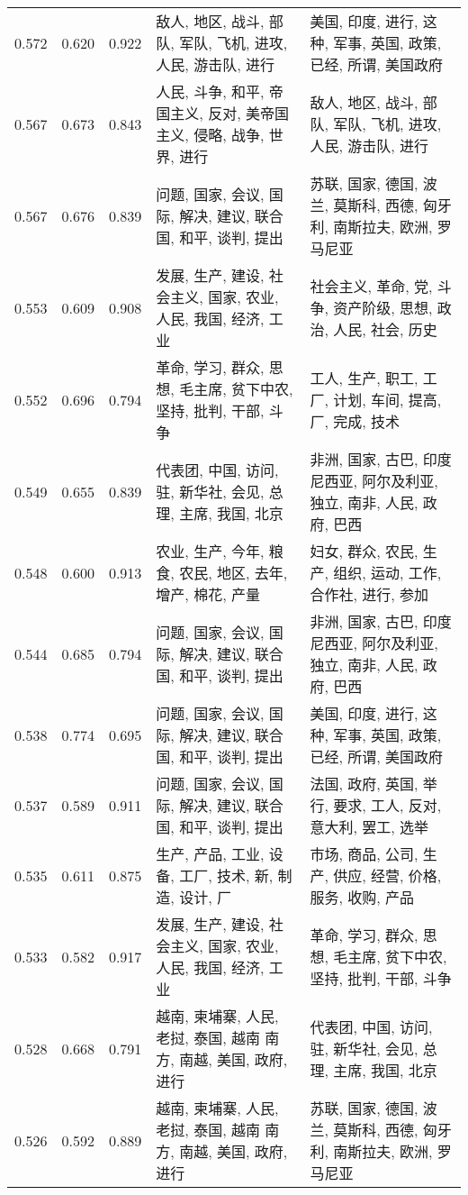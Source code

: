 \begin{tabular}{cccp{5cm}p{5cm}}
0.572 & 0.620 & 0.922 & 敌人, 地区, 战斗, 部队, 军队, 飞机, 进攻, 人民, 游击队, 进行 & 美国, 印度, 进行, 这种, 军事, 英国, 政策, 已经, 所谓, 美国政府 \\
0.567 & 0.673 & 0.843 & 人民, 斗争, 和平, 帝国主义, 反对, 美帝国主义, 侵略, 战争, 世界, 进行 & 敌人, 地区, 战斗, 部队, 军队, 飞机, 进攻, 人民, 游击队, 进行 \\
0.567 & 0.676 & 0.839 & 问题, 国家, 会议, 国际, 解决, 建议, 联合国, 和平, 谈判, 提出 & 苏联, 国家, 德国, 波兰, 莫斯科, 西德, 匈牙利, 南斯拉夫, 欧洲, 罗马尼亚 \\
0.553 & 0.609 & 0.908 & 发展, 生产, 建设, 社会主义, 国家, 农业, 人民, 我国, 经济, 工业 & 社会主义, 革命, 党, 斗争, 资产阶级, 思想, 政治, 人民, 社会, 历史 \\
0.552 & 0.696 & 0.794 & 革命, 学习, 群众, 思想, 毛主席, 贫下中农, 坚持, 批判, 干部, 斗争 & 工人, 生产, 职工, 工厂, 计划, 车间, 提高, 厂, 完成, 技术 \\
0.549 & 0.655 & 0.839 & 代表团, 中国, 访问, 驻, 新华社, 会见, 总理, 主席, 我国, 北京 & 非洲, 国家, 古巴, 印度尼西亚, 阿尔及利亚, 独立, 南非, 人民, 政府, 巴西 \\
0.548 & 0.600 & 0.913 & 农业, 生产, 今年, 粮食, 农民, 地区, 去年, 增产, 棉花, 产量 & 妇女, 群众, 农民, 生产, 组织, 运动, 工作, 合作社, 进行, 参加 \\
0.544 & 0.685 & 0.794 & 问题, 国家, 会议, 国际, 解决, 建议, 联合国, 和平, 谈判, 提出 & 非洲, 国家, 古巴, 印度尼西亚, 阿尔及利亚, 独立, 南非, 人民, 政府, 巴西 \\
0.538 & 0.774 & 0.695 & 问题, 国家, 会议, 国际, 解决, 建议, 联合国, 和平, 谈判, 提出 & 美国, 印度, 进行, 这种, 军事, 英国, 政策, 已经, 所谓, 美国政府 \\
0.537 & 0.589 & 0.911 & 问题, 国家, 会议, 国际, 解决, 建议, 联合国, 和平, 谈判, 提出 & 法国, 政府, 英国, 举行, 要求, 工人, 反对, 意大利, 罢工, 选举 \\
0.535 & 0.611 & 0.875 & 生产, 产品, 工业, 设备, 工厂, 技术, 新, 制造, 设计, 厂 & 市场, 商品, 公司, 生产, 供应, 经营, 价格, 服务, 收购, 产品 \\
0.533 & 0.582 & 0.917 & 发展, 生产, 建设, 社会主义, 国家, 农业, 人民, 我国, 经济, 工业 & 革命, 学习, 群众, 思想, 毛主席, 贫下中农, 坚持, 批判, 干部, 斗争 \\
0.528 & 0.668 & 0.791 & 越南, 柬埔寨, 人民, 老挝, 泰国, 越南 南方, 南越, 美国, 政府, 进行 & 代表团, 中国, 访问, 驻, 新华社, 会见, 总理, 主席, 我国, 北京 \\
0.526 & 0.592 & 0.889 & 越南, 柬埔寨, 人民, 老挝, 泰国, 越南 南方, 南越, 美国, 政府, 进行 & 苏联, 国家, 德国, 波兰, 莫斯科, 西德, 匈牙利, 南斯拉夫, 欧洲, 罗马尼亚 \\

\end{tabular}
